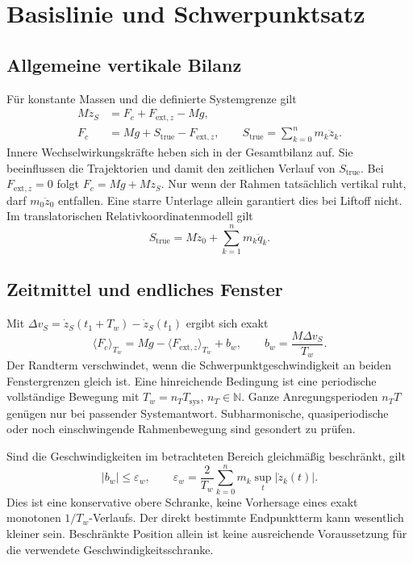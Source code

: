 \documentclass[11pt,a4paper]{article}
\begin{document}
\section{Basislinie und Schwerpunktsatz}\label{sec:bilanz}
\subsection{Allgemeine vertikale Bilanz}
Für konstante Massen und die definierte Systemgrenze gilt
\begin{align}
M\ddot z_S&=F_c+F_{\mathrm{ext},z}-Mg,\\
F_c&=Mg+S_{\mathrm{true}}-F_{\mathrm{ext},z},\qquad
S_{\mathrm{true}}=\sum_{k=0}^{n}m_k\ddot z_k.
\label{eq:bilanz}
\end{align}
Innere Wechselwirkungskräfte heben sich in der Gesamtbilanz auf. Sie beeinflussen die Trajektorien und damit den zeitlichen Verlauf von $S_{\mathrm{true}}$.
Bei $F_{\mathrm{ext},z}=0$ folgt $F_c=Mg+M\ddot z_S$. Nur wenn der Rahmen tatsächlich vertikal ruht, darf $m_0\ddot z_0$ entfallen. Eine starre Unterlage allein garantiert dies bei Liftoff nicht. Im translatorischen Relativkoordinatenmodell gilt
\begin{equation}
S_{\mathrm{true}}=M\ddot z_0+\sum_{k=1}^{n}m_k\ddot q_k.
\label{eq:rahmen}
\end{equation}

\subsection{Zeitmittel und endliches Fenster}
Mit $\Delta v_S=\dot z_S(t_1+T_w)-\dot z_S(t_1)$ ergibt sich exakt
\begin{equation}
\langle F_c\rangle_{T_w}=Mg-\langle F_{\mathrm{ext},z}\rangle_{T_w}+b_w,
\qquad b_w=\frac{M\Delta v_S}{T_w}.
\label{eq:fenster}
\end{equation}
Der Randterm verschwindet, wenn die Schwerpunktgeschwindigkeit an beiden Fenstergrenzen gleich ist. Eine hinreichende Bedingung ist eine periodische vollständige Bewegung mit $T_w=n_T T_{\mathrm{sys}}$, $n_T\in\mathbb N$. Ganze Anregungsperioden $n_TT$ genügen nur bei passender Systemantwort. Subharmonische, quasiperiodische oder noch einschwingende Rahmenbewegung sind gesondert zu prüfen.

Sind die Geschwindigkeiten im betrachteten Bereich gleichmäßig beschränkt, gilt
\begin{equation}
|b_w|\le\varepsilon_w,\qquad
\varepsilon_w=\frac{2}{T_w}\sum_{k=0}^{n}m_k\sup_t|\dot z_k(t)|.
\label{eq:bound}
\end{equation}
Dies ist eine konservative obere Schranke, keine Vorhersage eines exakt monotonen $1/T_w$-Verlaufs. Der direkt bestimmte Endpunktterm kann wesentlich kleiner sein. Beschränkte Position allein ist keine ausreichende Voraussetzung für die verwendete Geschwindigkeitsschranke.
\end{document}

